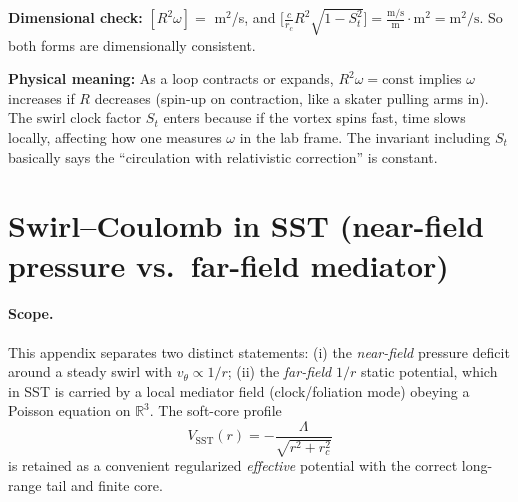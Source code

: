         \noindent\textbf{Dimensional check:} $[R^2 \omega] =$ m$^2$/s, and
        $\big[\frac{c}{r_c}R^2\sqrt{1 - S_t^2}\big] = \frac{\text{m/s}}{\text{m}} \cdot \text{m}^2 = \text{m}^2/\text{s}$. So both forms are dimensionally consistent.

        \noindent\textbf{Physical meaning:} As a loop contracts or expands, $R^2 \omega = \text{const}$ implies $\omega$ increases if $R$ decreases (spin-up on contraction, like a skater pulling arms in). The swirl clock factor $S_t$ enters because if the vortex spins fast, time slows locally, affecting how one measures $\omega$ in the lab frame. The invariant including $S_t$ basically says the “circulation with relativistic correction” is constant.

    \section{Swirl--Coulomb in SST (near-field pressure vs.\ far-field mediator)}\label{app:swirl_coulomb}
    \paragraph{Scope.}
    This appendix separates two distinct statements:
    (i) the \emph{near-field} pressure deficit around a steady swirl with $v_\theta\propto 1/r$;
    (ii) the \emph{far-field} $1/r$ static potential, which in SST is carried by a local mediator field
    (clock/foliation mode) obeying a Poisson equation on $\mathbb{R}^3$.
    The soft-core profile
    \begin{equation}
    V_{\mathrm{SST}}(r)=-\frac{\Lambda}{\sqrt{r^2+r_c^2}}
    \label{eq:VSST_softcore}
    \end{equation}
    is retained as a convenient regularized \emph{effective} potential with the correct long-range tail and finite core.


